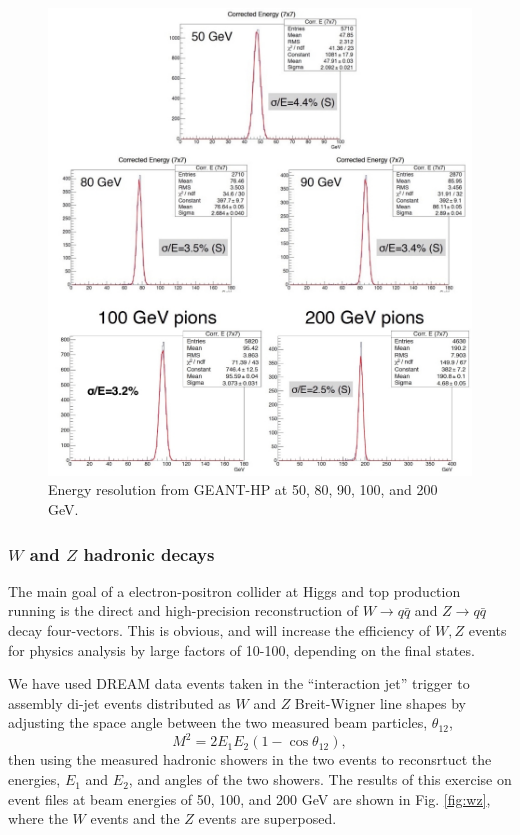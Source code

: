 \begin{figure}
 \centering
 \includegraphics[scale=0.6]{Calorimeter/DualReadout/eres.jpg}
  \caption{Energy resolution from GEANT-HP at 50, 80, 90, 100, and 200 GeV.}
  \label{fig:eres}
\end{figure}


\subsubsection{$W$ and $Z$ hadronic decays}

The main goal of a electron-positron collider at  Higgs and top production running is the direct and high-precision reconstruction of  $W \rightarrow q\bar{q}$ and  $Z \rightarrow q\bar{q}$ decay four-vectors.   This is obvious, and will increase the efficiency of $W,Z$ events for physics analysis by large factors of 10-100, depending on the final states.

We have used DREAM data events taken in the ``interaction jet'' trigger to assembly di-jet events distributed as $W$ and $Z$ Breit-Wigner line shapes by adjusting the space angle between the two measured beam particles, $\theta_{12}$, 
\begin{displaymath}
   M^2 = 2 E_1 E_2 ( 1 - \cos \theta_{12}),
\end{displaymath}
then using the measured hadronic showers in the two events to reconsrtuct the energies, $E_1$ and $E_2$, and angles of the two showers.  The results of this exercise on event files at beam energies of 50, 100, and 200 GeV are shown in 
Fig. \ref{fig:wz}, where the $W$ events and the $Z$ events are superposed.


